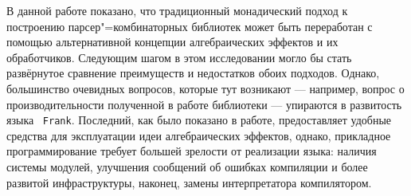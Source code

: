 \documentclass [a4paper] {article}
\begin{document}
В данной работе показано, что традиционный монадический подход к построению парсер"=комбинаторных библиотек может быть переработан с помощью альтернативной концепции алгебраических эффектов и их обработчиков. Следующим шагом в этом исследовании могло бы стать развёрнутое сравнение преимуществ и недостатков обоих подходов. Однако, большинство очевидных вопросов, которые тут возникают --- например, вопрос о производительности полученной в работе библиотеки --- упираются в развитость языка ~\texttt{Frank}. Последний, как было показано в работе, предоставляет удобные средства для эксплуатации
идеи алгебраических эффектов, однако, прикладное программирование требует большей
зрелости от реализации языка: наличия системы модулей, улучшения сообщений об
ошибках компиляции и более развитой инфраструктуры, наконец, замены интерпретатора компилятором.

\printbibliography

\end{document}
